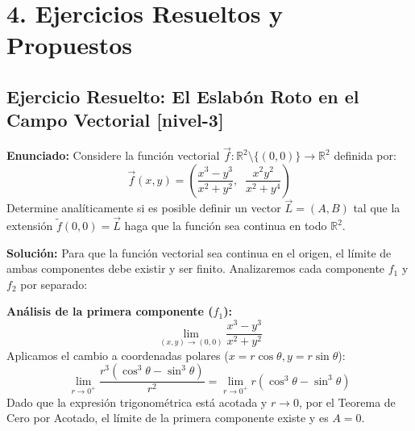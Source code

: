 \documentclass[11pt]{article}
\newenvironment{ejercicios}{%
  \section*{4. Ejercicios Resueltos y Propuestos}%
}{}
\newenvironment{ejercicioresuelto}[2]{\subsection*{Ejercicio Resuelto: #1 \small{[#2]}}}{}
\newcommand{\enunciado}[1]{\textbf{Enunciado:} #1\par\vspace{0.2cm}}
\newcommand{\solucion}[1]{\textbf{Solución:} #1\par\vspace{0.4cm}}
\begin{document}
\begin{ejercicios}

  \begin{ejercicioresuelto}{El Eslabón Roto en el Campo Vectorial}{nivel-3}
    \enunciado{
      Considere la función vectorial $\vec{f} \colon \mathbb{R}^2 \setminus \{(0,0)\} \to \mathbb{R}^2$ definida por:
      $$ \vec{f}(x,y) = \left( \displaystyle \dfrac{x^3 - y^3}{x^2 + y^2}, \;\; \displaystyle \dfrac{x^2 y^2}{x^2 + y^4} \right) $$
      Determine analíticamente si es posible definir un vector $\vec{L} = (A, B)$ tal que la extensión $\tilde{f}(0,0) = \vec{L}$ haga que la función sea continua en todo $\mathbb{R}^2$.
    }
    \solucion{
      Para que la función vectorial sea continua en el origen, el límite de ambas componentes debe existir y ser finito. Analizaremos cada componente $f_1$ y $f_2$ por separado:

      \textbf{Análisis de la primera componente ($f_1$):}
      $$ \displaystyle \lim\limits_{(x,y) \to (0,0)} \displaystyle \dfrac{x^3 - y^3}{x^2 + y^2} $$
      Aplicamos el cambio a coordenadas polares ($x = r\cos\theta, y = r\sin\theta$):
      $$ \displaystyle \lim\limits_{r \to 0^+} \displaystyle \dfrac{r^3(\cos^3\theta - \sin^3\theta)}{r^2} = \displaystyle \lim\limits_{r \to 0^+} r(\cos^3\theta - \sin^3\theta) $$
      Dado que la expresión trigonométrica está acotada y $r \to 0$, por el Teorema de Cero por Acotado, el límite de la primera componente existe y es $A = 0$.

}
\end{ejercicioresuelto}
\end{ejercicios}
\end{document}
